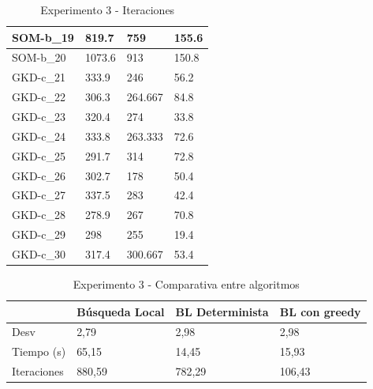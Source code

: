 \documentclass[11pt,a4paper]{article}
\begin{document}
\begin{table}[H]
\begin{tabular}{l|l|l|l|}
			\multicolumn{1}{|l|}{SOM-b\_19} & 819.7          & 759             & 155.6         \\ \hline
			\multicolumn{1}{|l|}{SOM-b\_20} & 1073.6         & 913             & 150.8         \\ \hline
			\multicolumn{1}{|l|}{GKD-c\_21} & 333.9          & 246             & 56.2          \\ \hline
			\multicolumn{1}{|l|}{GKD-c\_22} & 306.3          & 264.667         & 84.8          \\ \hline
			\multicolumn{1}{|l|}{GKD-c\_23} & 320.4          & 274             & 33.8          \\ \hline
			\multicolumn{1}{|l|}{GKD-c\_24} & 333.8          & 263.333         & 72.6          \\ \hline
			\multicolumn{1}{|l|}{GKD-c\_25} & 291.7          & 314             & 72.8          \\ \hline
			\multicolumn{1}{|l|}{GKD-c\_26} & 302.7          & 178             & 50.4          \\ \hline
			\multicolumn{1}{|l|}{GKD-c\_27} & 337.5          & 283             & 42.4          \\ \hline
			\multicolumn{1}{|l|}{GKD-c\_28} & 278.9          & 267             & 70.8          \\ \hline
			\multicolumn{1}{|l|}{GKD-c\_29} & 298            & 255             & 19.4          \\ \hline
			\multicolumn{1}{|l|}{GKD-c\_30} & 317.4          & 300.667         & 53.4          \\ \hline
		\end{tabular}
		\caption{ Experimento 3 - Iteraciones }
		\label{iteraciones3}
	\end{table}
	
	\begin{table}[H]
		\begin{tabular}{l|l|l|l|}
			\cline{2-4}
			& Búsqueda Local & BL Determinista & BL con greedy \\ \hline
			\multicolumn{1}{|l|}{Desv}        & 2,79           & 2,98            & 2,98          \\ \hline
			\multicolumn{1}{|l|}{Tiempo (s)}  & 65,15          & 14,45           & 15,93         \\ \hline
			\multicolumn{1}{|l|}{Iteraciones} & 880,59         & 782,29          & 106,43        \\ \hline
		\end{tabular}
		\caption{ Experimento 3 - Comparativa entre algoritmos }
		\label{comparativa3}
	\end{table}
\end{document}
